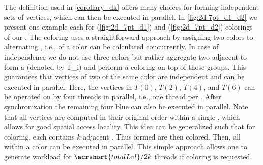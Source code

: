  
The definition used in \cref{corollary_dk} offers many choices for
forming \DK independent sets of vertices, which can then be executed
in parallel.  In \cref{fig:2d-7pt_d1_d2} we present one example each
for \DONE (\cref{fig:2d_7pt_d1}) and \DTWO (\cref{fig:2d_7pt_d2})
colorings of our \stex. The \DONE coloring uses a straightforward
approach by assigning two colors to alternating \levels, i.e., \levels
of a color can be calculated concurrently. In case of \DTWO
independence we do not use three colors but rather aggregate two
adjacent \levels to form a \textit{\levelGroup} (denoted by
\acrshort{T_i}) and perform a \DONE coloring on top of those
groups. This guarantees that vertices of two \levelGroups of the same
color are \DTWO independent and can be executed in parallel. Here, the
vertices in $T(0)$, $T(2)$, $T(4)$, and $T(6)$ can be operated on by
four threads in parallel, i.e., one thread per \levelGroup.  After
synchronization the remaining four blue \levelGroups can also be
executed in parallel. Note that all vertices are computed in their
original order within a single \levelGroup, which allows for good
spatial access locality. This idea can be generalized such that for \DK
coloring, each \levelGroup contains $k$ adjacent \levels.
Thus formed \levelGroups are then \DONE
colored. Then, all \levelGroups within a color can be executed in
parallel. This simple approach allows one to generate workload for
${\acrshort{totalLvl}}/{2 k}$ threads if \DK coloring is
requested.
 
